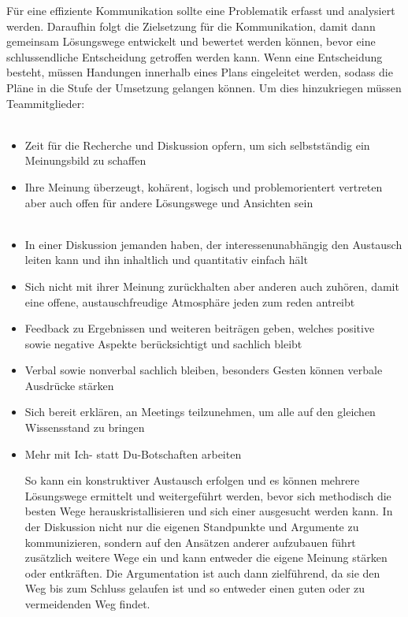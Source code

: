 \documentclass{article}
\begin{document}
Für eine effiziente Kommunikation sollte eine Problematik erfasst und analysiert werden. Daraufhin folgt die Zielsetzung für die Kommunikation, damit dann gemeinsam Lösungswege entwickelt und bewertet werden können, bevor eine schlussendliche Entscheidung getroffen werden kann. Wenn eine Entscheidung besteht, müssen Handungen innerhalb eines Plans eingeleitet werden, sodass die Pläne in die Stufe der Umsetzung gelangen können. Um dies hinzukriegen müssen Teammitglieder:\\\\
\begin{itemize}
    \item Zeit für die Recherche und Diskussion opfern, um sich selbstständig ein Meinungsbild zu schaffen
    \item Ihre Meinung überzeugt, kohärent, logisch und problemorientert vertreten aber auch offen für andere Lösungswege und Ansichten sein \\\\
    \item In einer Diskussion jemanden haben, der interessenunabhängig den Austausch leiten kann und ihn inhaltlich und quantitativ einfach hält
    \item Sich nicht mit ihrer Meinung zurückhalten aber anderen auch zuhören, damit eine offene, austauschfreudige Atmosphäre jeden zum reden antreibt
    \item Feedback zu Ergebnissen und weiteren beiträgen geben, welches positive sowie negative Aspekte berücksichtigt und sachlich bleibt
    \item Verbal sowie nonverbal sachlich bleiben, besonders Gesten können verbale Ausdrücke stärken
    \item Sich bereit erklären, an Meetings teilzunehmen, um alle auf den gleichen Wissensstand zu bringen 
    \item Mehr mit Ich- statt Du-Botschaften arbeiten\newline
    

So kann ein konstruktiver Austausch erfolgen und es können mehrere Lösungswege ermittelt und weitergeführt werden, bevor sich methodisch die besten Wege herauskristallisieren und sich einer ausgesucht werden kann. In der Diskussion nicht nur die eigenen Standpunkte und Argumente zu kommunizieren, sondern auf den Ansätzen anderer aufzubauen führt zusätzlich weitere Wege ein und kann entweder die eigene Meinung stärken oder entkräften. Die Argumentation ist auch dann zielführend, da sie den Weg bis zum Schluss gelaufen ist und so entweder einen guten oder zu vermeidenden Weg findet.
    


\end{itemize}
\end{document}
